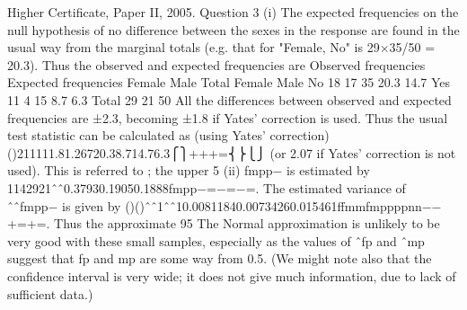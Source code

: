Higher Certificate, Paper II, 2005. Question 3
(i) The expected frequencies on the null hypothesis of no difference between the sexes in the response are found in the usual way from the marginal totals (e.g. that for "Female, No" is 29×35/50 = 20.3). Thus the observed and expected frequencies are
Observed frequencies
Expected frequencies
Female
Male
Total
Female
Male
No
18
17
35
20.3
14.7
Yes
11
4
15
8.7
6.3
Total
29
21
50
All the differences between observed and expected frequencies are ±2.3, becoming ±1.8 if Yates' correction is used. Thus the usual test statistic can be calculated as (using Yates' correction)
()211111.81.26720.38.714.76.3⎧⎫+++=⎨⎬⎩⎭
(or 2.07 if Yates' correction is not used). This is referred to ; the upper 5%
(ii) fmpp− is estimated by 1142921ˆˆ0.37930.19050.1888fmpp−=−=−=. The estimated variance of ˆˆfmpp− is given by
()()ˆˆ1ˆˆ10.00811840.00734260.015461ffmmfmppppnn−−+=+=.
Thus the approximate 95%
The Normal approximation is unlikely to be very good with these small samples, especially as the values of ˆfp and ˆmp suggest that fp and mp are some way from 0.5.
(We might note also that the confidence interval is very wide; it does not give much information, due to lack of sufficient data.)
